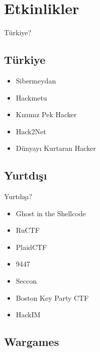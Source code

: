 \documentclass[compress]{beamer}
\begin{document}
\section{Etkinlikler}

\begin{frame}{Türkiye?}

\subsection{Türkiye}

\begin{itemize}
	\item Sibermeydan
    \item Hackmetu
    \item Kızımız Pek Hacker
    \item Hack2Net
    \item Dünyayı Kurtaran Hacker
\end{itemize}

\end{frame}

\subsection{Yurtdışı}

\begin{frame}{Yurtdışı?}

\begin{itemize}
	\item Ghost in the Shellcode
    \item RuCTF
    \item PlaidCTF
    \item 9447
    \item Seccon
    \item Boston Key Party CTF
    \item HackIM
\end{itemize}

\end{frame}

\subsection{Wargames}
\end{document}

